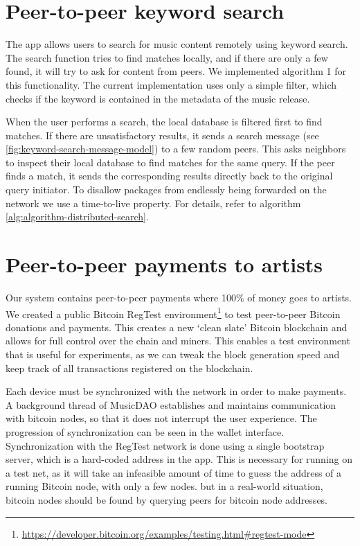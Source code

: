 \section{Peer-to-peer keyword search}
\label{sec:searching-musiccommunity-impl}
The app allows users to search for music content remotely using keyword search. The search function tries to find matches locally, and if there are only a few found, it will try to ask for content from peers. We implemented algorithm 1 for this functionality. The current implementation uses only a simple filter, which checks if the keyword is contained in the metadata of the music release.

When the user performs a search, the local database is filtered first to find matches. If there are unsatisfactory results, it sends a search message (see \ref{fig:keyword-search-message-model}) to a few random peers. This asks neighbors to inspect their local database to find matches for the same query. If the peer finds a match, it sends the corresponding results directly back to the original query initiator. To disallow packages from endlessly being forwarded on the network we use a time-to-live property. For details, refer to algorithm \ref{alg:algorithm-distributed-search}.

\section{Peer-to-peer payments to artists}
\label{sec:regtest-network-impl}
Our system contains peer-to-peer payments where 100\% of money goes to artists. We created a public Bitcoin RegTest environment\footnote{\url{https://developer.bitcoin.org/examples/testing.html\#regtest-mode}} to test peer-to-peer Bitcoin donations and payments. This creates a new `clean slate' Bitcoin blockchain and allows for full control over the chain and miners. This enables a test environment that is useful for experiments, as we can tweak the block generation speed and keep track of all transactions registered on the blockchain. 

Each device must be synchronized with the network in order to make payments. A background thread of MusicDAO establishes and maintains communication with bitcoin nodes, so that it does not interrupt the user experience. The progression of synchronization can be seen in the wallet interface. Synchronization with the RegTest network is done using a single bootstrap server, which is a hard-coded address in the app. This is necessary for running on a test net, as it will take an infeasible amount of time to guess the address of a running Bitcoin node, with only a few nodes. but in a real-world situation, bitcoin nodes should be found by querying peers for bitcoin node addresses.

